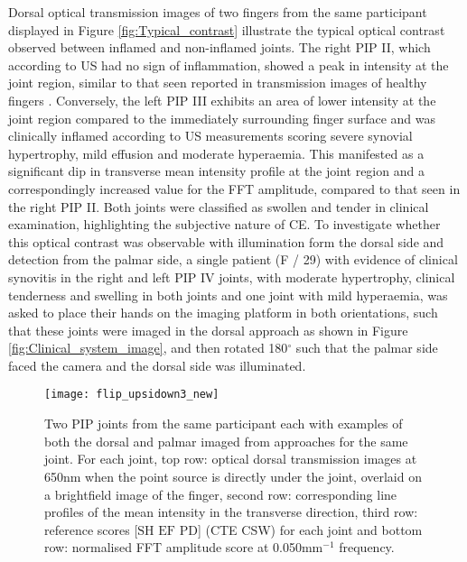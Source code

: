 \documentclass[twoside]{bhamthesis}
\theoremstyle{definition}
\begin{document}
Dorsal optical transmission images of two fingers from the same participant displayed in Figure \ref{fig:Typical_contrast} illustrate the typical optical contrast observed between inflamed and non-inflamed joints. The right PIP II, which according to US had no sign of inflammation, showed a peak in intensity at the joint region, similar to that seen reported in transmission images of healthy fingers \cite{lighter2018multispectral}. Conversely, the left PIP III exhibits an area of lower intensity at the joint region compared to the immediately surrounding finger surface and was clinically inflamed according to US measurements scoring severe synovial hypertrophy, mild effusion and moderate hyperaemia. This manifested as a significant dip in transverse mean intensity profile at the joint region and a correspondingly increased value for the FFT amplitude, compared to that seen in the right PIP II. Both joints were classified as swollen and tender in clinical examination, highlighting the subjective nature of CE. 
To investigate whether this optical contrast was observable with illumination form the dorsal side and detection from the palmar side, a single patient (F / 29) with evidence of clinical synovitis in the right and left PIP IV joints, with moderate hypertrophy, clinical tenderness and swelling in both joints and one joint with mild hyperaemia, was asked to place their hands on the imaging platform in both orientations, such that these joints were imaged in the dorsal approach as shown in Figure \ref{fig:Clinical_system_image}, and then rotated 180$^\circ$ such that the palmar side faced the camera and the dorsal side was illuminated.

\begin{figure}[!ht]
\centering\texttt{[image: flip\_upsidown3\_new]}\caption{Two PIP joints from the same participant each with examples of both the dorsal and palmar imaged from approaches for the same joint. For each joint, top row: optical dorsal transmission images at 650nm when the point source is directly under the joint, overlaid on a brightfield image of the finger, second row: corresponding line profiles of the mean intensity in the transverse direction, third row: reference scores  [$\mathrm{SH}$ $\mathrm{EF}$ $\mathrm{PD}$] (CTE CSW) for each joint and bottom row: normalised FFT amplitude score at 0.050mm$^{-1}$ frequency.}
  \label{fig:spectral_change}
\end{figure}
\end{document}
